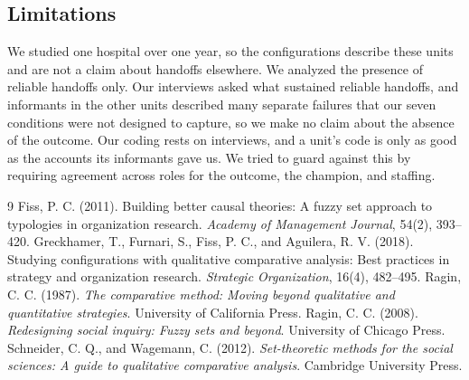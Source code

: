 \documentclass[12pt]{article}
\begin{document}
\subsection{Limitations}

We studied one hospital over one year, so the configurations describe these units and are not a claim about handoffs elsewhere. We analyzed the presence of reliable handoffs only. Our interviews asked what sustained reliable handoffs, and informants in the other units described many separate failures that our seven conditions were not designed to capture, so we make no claim about the absence of the outcome. Our coding rests on interviews, and a unit's code is only as good as the accounts its informants gave us. We tried to guard against this by requiring agreement across roles for the outcome, the champion, and staffing.

\begin{thebibliography}{9}
\setlength{\itemsep}{0pt}
 Fiss, P. C. (2011). Building better causal theories: A fuzzy set approach to typologies in organization research. \textit{Academy of Management Journal}, 54(2), 393--420.
 Greckhamer, T., Furnari, S., Fiss, P. C., and Aguilera, R. V. (2018). Studying configurations with qualitative comparative analysis: Best practices in strategy and organization research. \textit{Strategic Organization}, 16(4), 482--495.
 Ragin, C. C. (1987). \textit{The comparative method: Moving beyond qualitative and quantitative strategies}. University of California Press.
 Ragin, C. C. (2008). \textit{Redesigning social inquiry: Fuzzy sets and beyond}. University of Chicago Press.
 Schneider, C. Q., and Wagemann, C. (2012). \textit{Set-theoretic methods for the social sciences: A guide to qualitative comparative analysis}. Cambridge University Press.
\end{thebibliography}
\end{document}
